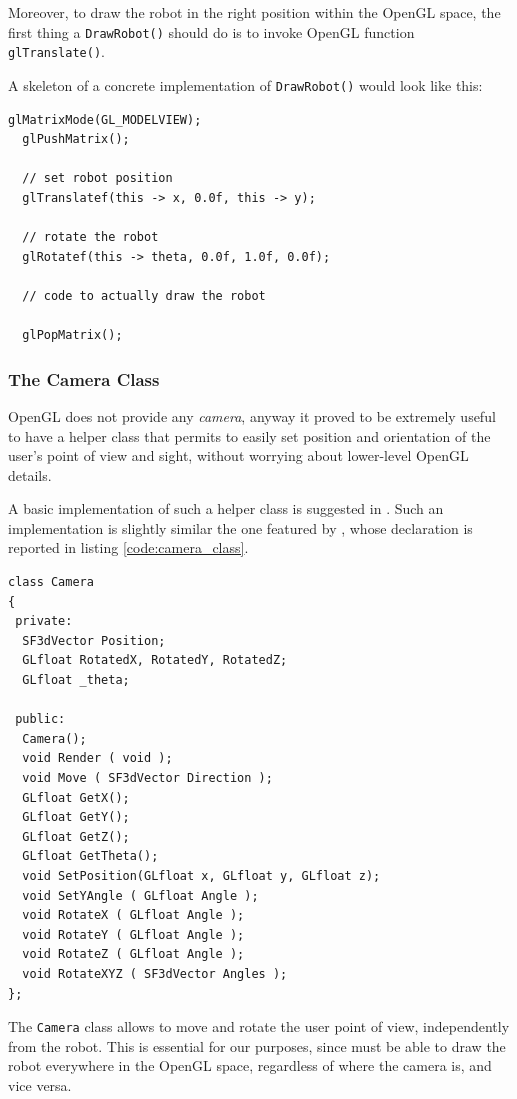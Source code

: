 %
Moreover, to draw the robot in the right position within 
the OpenGL space, the first thing a \texttt{DrawRobot()} should 
do is to invoke OpenGL function \texttt{glTranslate()}.
%

%
A skeleton of a concrete implementation of \texttt{DrawRobot()}
would look like this:
\begin{lstlisting}[caption={\texttt{DrawRobot()} skeleton}, label={code:drawrobot_skeleton}, frame=trBL]  
  glMatrixMode(GL_MODELVIEW);
  glPushMatrix();

  // set robot position
  glTranslatef(this -> x, 0.0f, this -> y);

  // rotate the robot 
  glRotatef(this -> theta, 0.0f, 1.0f, 0.0f);

  // code to actually draw the robot

  glPopMatrix();
\end{lstlisting}
%

%
\subsubsection{The Camera Class}
\label{sub:cameraclass}

OpenGL does not provide any \textit{camera}, anyway it proved 
to be extremely useful to have a helper class that permits 
to easily set position and orientation of the user's 
point of view and sight, without worrying about lower-level 
OpenGL details.
%

%
A basic implementation of such a helper class is suggested 
in \cite{opengl:camera}. Such an implementation is slightly 
similar the one featured by \framework{}, whose 
declaration is reported in listing \ref{code:camera_class}.
%
\begin{lstlisting}[caption={\texttt{Camera} class declaration}, label={code:camera_class}, frame=trBL]
class Camera
{
 private:
  SF3dVector Position;
  GLfloat RotatedX, RotatedY, RotatedZ;	
  GLfloat _theta;

 public:
  Camera();
  void Render ( void );
  void Move ( SF3dVector Direction );
  GLfloat GetX();
  GLfloat GetY();
  GLfloat GetZ();
  GLfloat GetTheta();
  void SetPosition(GLfloat x, GLfloat y, GLfloat z);
  void SetYAngle ( GLfloat Angle );
  void RotateX ( GLfloat Angle );
  void RotateY ( GLfloat Angle );
  void RotateZ ( GLfloat Angle );
  void RotateXYZ ( SF3dVector Angles );
};
\end{lstlisting}
%
The \texttt{Camera} class allows to move and rotate the user 
point of view, independently from the robot.
%
This is essential for our purposes, since \framework{}
must be able to draw the robot everywhere in the OpenGL space, 
regardless of where the camera is, and vice versa.
%

